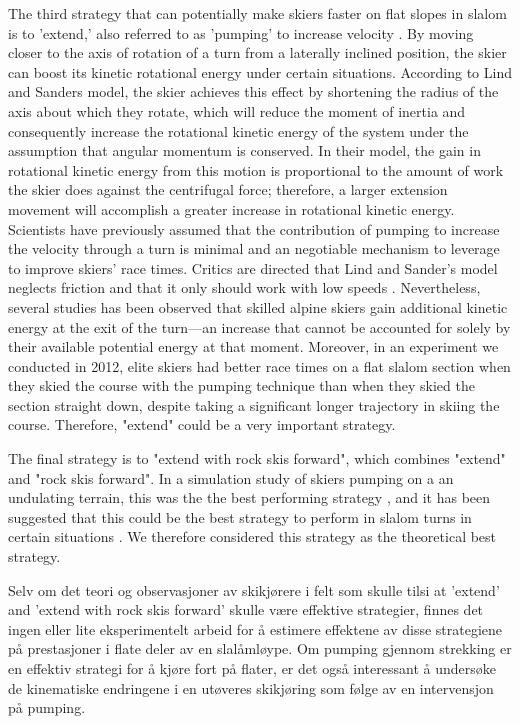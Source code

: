 \documentclass{report}
\begin{document}
The third strategy that can potentially make skiers faster on flat slopes in slalom is to 'extend,' also referred to as 'pumping' to increase velocity \cite{lind_physics_2013}. By moving closer to the axis of rotation of a turn from a laterally inclined position, the skier can boost its kinetic rotational energy under certain situations. According to Lind and Sanders \cite{lind_physics_2013} model, the skier achieves this effect by shortening the radius of the axis about which they rotate, which will reduce the moment of inertia and consequently increase the rotational kinetic energy of the system under the assumption that angular momentum is conserved. In their model, the gain in rotational kinetic energy from this motion is proportional to the amount of work the skier does against the centrifugal force; therefore, a larger extension movement will accomplish a greater increase in rotational kinetic energy. Scientists have previously assumed that the contribution of pumping to increase the velocity through a turn is minimal and an negotiable mechanism to leverage to improve skiers' race times\cite{supej_differential_2008}. Critics are directed that Lind and Sander's model neglects friction and that it only should work with low speeds \cite{supej_differential_2008, supej_how_2010}. Nevertheless, several studies has been observed that skilled alpine skiers gain additional kinetic energy at the exit of the turn—an increase that cannot be accounted for solely by their available potential energy at that moment\cite{reid_kinematic_2010, supej_how_2010, supej_differential_2008}. Moreover, in an experiment we conducted in 2012, elite skiers had better race times on a flat slalom section when they skied the course with the pumping technique than when they skied the section straight down, despite taking a significant longer trajectory in skiing the course. Therefore, "extend" could be a very important strategy.  

The final strategy is to "extend with rock skis forward", which combines "extend" and "rock skis forward". In a simulation study of skiers pumping on a an undulating terrain, this was the the best performing strategy \cite{mote_accelerations_1983}, and it has been suggested that this could be the best strategy to perform in slalom turns in certain situations \cite{reid_kinematic_2010}. We therefore considered this strategy as the theoretical best strategy. 

Selv om det teori og observasjoner av skikjørere i felt som skulle tilsi at 'extend' and 'extend with rock skis forward' skulle være effektive strategier, finnes det ingen eller lite eksperimentelt arbeid for å estimere effektene av disse strategiene på prestasjoner i flate deler av en slalåmløype. Om pumping gjennom strekking er en effektiv strategi for å kjøre fort på flater, er det også interessant å undersøke de kinematiske endringene i en utøveres skikjøring som følge av en intervensjon på pumping. 
\end{document}
